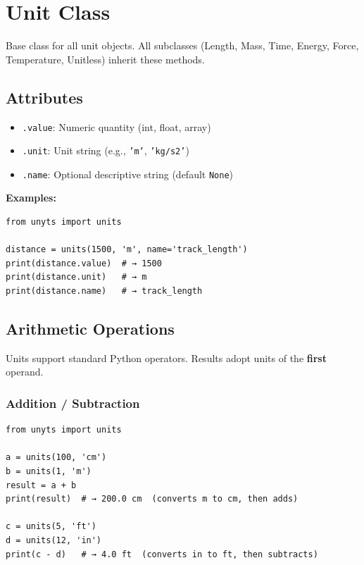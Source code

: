 \documentclass[11pt,a4paper]{report}
\begin{document}
\section{Unit Class}

Base class for all unit objects. All subclasses (Length, Mass, Time, Energy, Force, Temperature, Unitless) inherit these methods.

\subsection{Attributes}

\begin{itemize}
\item \texttt{.value}: Numeric quantity (int, float, array)
\item \texttt{.unit}: Unit string (e.g., \texttt{'m'}, \texttt{'kg/s2'})
\item \texttt{.name}: Optional descriptive string (default \texttt{None})
\end{itemize}

\textbf{Examples:}
\begin{lstlisting}[style=pythonstyle]
from unyts import units

distance = units(1500, 'm', name='track_length')
print(distance.value)  # → 1500
print(distance.unit)   # → m
print(distance.name)   # → track_length
\end{lstlisting}

\subsection{Arithmetic Operations}

Units support standard Python operators. Results adopt units of the \textbf{first} operand.

\subsubsection{Addition / Subtraction}

\begin{lstlisting}[style=pythonstyle]
from unyts import units

a = units(100, 'cm')
b = units(1, 'm')
result = a + b
print(result)  # → 200.0 cm  (converts m to cm, then adds)

c = units(5, 'ft')
d = units(12, 'in')
print(c - d)   # → 4.0 ft  (converts in to ft, then subtracts)
\end{lstlisting}
\end{document}
